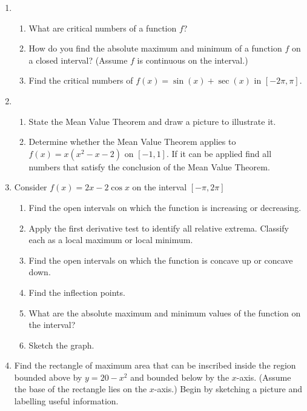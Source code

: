 \documentclass[11pt,fleqn]{article}
\newcommand{\be}{\begin{enumerate}}
\newcommand{\ee}{\end{enumerate}}
\begin{document}
\begin{enumerate}
\item 
\be
\item What are critical numbers of a function $f$?
\vspace{1in}
\item How do you find the absolute maximum and minimum of a function $f$ on a
  closed interval? (Assume $f$ is continuous on the interval.)
  \vspace{1in}
  \item Find the critical numbers of $f(x) = \sin(x) +
\sec(x)$ in $[-2\pi, \pi]$.
\ee
\vfill
\item 
\be
\item State the Mean Value Theorem and draw a picture to illustrate it.
\vspace{2in}
\item Determine whether the Mean Value Theorem applies
to $f(x) = x(x^2 - x - 2)$ on $[-1, 1]$. If it can be applied find all
numbers that satisfy the conclusion of the Mean Value Theorem. 
\ee
\vfill
\newpage

\item Consider $f(x) = 2x- 2 \cos x$ on the interval $[- \pi, 2\pi]$
\be
 \item Find the open intervals on which the function is increasing or
    decreasing. \vfill
  \item Apply the first derivative test to identify all relative
    extrema. Classify each as a local maximum or local minimum.
    \vskip0.5in
  \item Find the open intervals on which the function is concave up or
    concave down.\vfill
      \item Find the inflection points.  \vskip0.5in
\item What are the absolute maximum and minimum values of the function on the interval?
\vfill
  \item Sketch the graph.
  \ee

\begin{center}
\end{center}
  
  \newpage
  \item Find the rectangle of maximum area that can be inscribed inside the region bounded above by $y=20-x^2$ and bounded below by the $x$-axis. (Assume the base of the rectangle lies on the $x$-axis.) Begin by sketching a picture and labelling useful information.
  

\end{enumerate}
\end{document}
